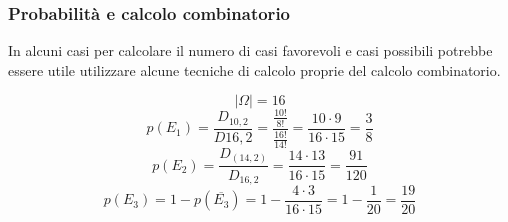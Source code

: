 \documentclass{article}     %
\begin{document}
        \subsubsection{Probabilità e calcolo combinatorio}
            In alcuni casi per calcolare il numero di casi favorevoli e casi possibili potrebbe essere utile utilizzare alcune tecniche di calcolo proprie del calcolo combinatorio.
            \begin{ex} 
               
            

            \[|\Omega|=16\]
            \[p(E_1)=\frac{D_{10,2}}{D{16,2}}=\frac{\frac{10!}{8!}}{\frac{16!}{14!}}=\frac{10\cdot9}{16\cdot15}=\frac{3}{8}\]
            \[p(E_2)=\frac{D_(14,2)}{D_{16,2}}=\frac{14\cdot13}{16\cdot15}=\frac{91}{120}\]
            \[p(E_3)=1-p(\overline{E_3})=1-\frac{4\cdot3}{16\cdot15}=1-\frac{1}{20}=\frac{19}{20}\]
            \end{ex}
\end{document}
